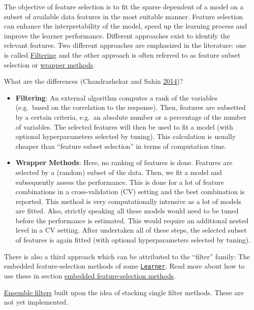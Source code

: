 \documentclass[]{article}
\providecommand{\tightlist}{%
  \setlength{\itemsep}{0pt}\setlength{\parskip}{0pt}}
\begin{document}
The objective of feature selection is to fit the sparse dependent of a model on a subset of available data features in the most suitable manner.
Feature selection can enhance the interpretability of the model, speed up the learning process and improve the learner performance.
Different approaches exist to identify the relevant features.
Two different approaches are emphasized in the literature:
one is called \protect\hyperlink{fs-filtering}{Filtering} and the other approach is often referred to as feature subset selection or \protect\hyperlink{fs-wrapper}{wrapper methods}.

What are the differences (Chandrashekar and Sahin \protect\hyperlink{ref-chandrashekar2014}{2014})?

\begin{itemize}
\tightlist
\item
  \textbf{Filtering}: An external algorithm computes a rank of the variables (e.g.~based on the correlation to the response).
  Then, features are subsetted by a certain criteria, e.g.~an absolute number or a percentage of the number of variables.
  The selected features will then be used to fit a model (with optional hyperparameters selected by tuning).
  This calculation is usually cheaper than ``feature subset selection'' in terms of computation time.
\item
  \textbf{Wrapper Methods}: Here, no ranking of features is done.
  Features are selected by a (random) subset of the data.
  Then, we fit a model and subsequently assess the performance.
  This is done for a lot of feature combinations in a cross-validation (CV) setting and the best combination is reported.
  This method is very computationally intensive as a lot of models are fitted.
  Also, strictly speaking all these models would need to be tuned before the performance is estimated.
  This would require an additional nested level in a CV setting.
  After undertaken all of these steps, the selected subset of features is again fitted (with optional hyperparameters selected by tuning).
\end{itemize}

There is also a third approach which can be attributed to the ``filter'' family:
The embedded feature-selection methods of some \href{https://mlr3.mlr-org.com/reference/Learner.html}{\texttt{Learner}}.
Read more about how to use these in section \protect\hyperlink{fs-embedded}{embedded feature-selection methods}.

\protect\hyperlink{fs-ensemble}{Ensemble filters} built upon the idea of stacking single filter methods.
These are not yet implemented.
\end{document}
